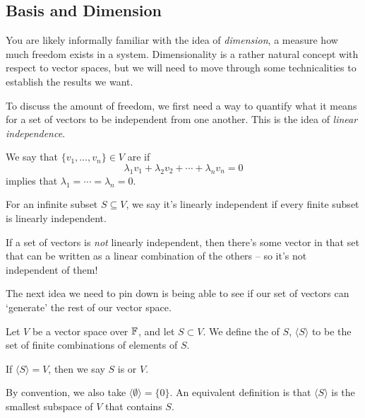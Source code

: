 \documentclass[a4paper]{scrartcl}
\begin{document}
\subsection{Basis and Dimension}

You are likely informally familiar with the idea of \emph{dimension}, a measure how much freedom exists in a system. Dimensionality is a rather natural concept with respect to vector spaces, but we will need to move through some technicalities to establish the results we want.

To discuss the amount of freedom, we first need a way to quantify what it means for a set of vectors to be independent from one another. This is the idea of \emph{linear independence}.


\begin{definition}
We say that $\{v_1, \dots, v_n\} \in V$ are  if
$$
\lambda_1 v_1 + \lambda_2 v_2 + \cdots + \lambda_n v_n = 0
$$
implies that $\lambda_1 = \cdots = \lambda_n = 0$.
\end{definition}

\begin{remark}
    For an infinite subset $S \subseteq V$, we say it's linearly independent if every finite subset is linearly independent.
\end{remark}

If a set of vectors is \emph{not} linearly independent, then there's some vector in that set that can be written as a linear combination of the others -- so it's not independent of them!

The next idea we need to pin down is being able to see if our set of vectors can `generate' the rest of our vector space. 


\begin{definition}[Span]
    Let $V$ be a vector space over $\mathbb{F}$, and let $S \subset V$. We define the  of $S$, $\langle S \rangle$ to be the set of finite combinations of elements of $S$.

    If $\langle S \rangle = V$, then we say $S$ is  or  $V$.
\end{definition}

\begin{remark}
    By convention, we also take $\langle \emptyset \rangle = \{ 0\}$. An equivalent definition is that $\langle S \rangle$ is the smallest subspace of $V$ that contains $S$.
\end{remark}
\end{document}
